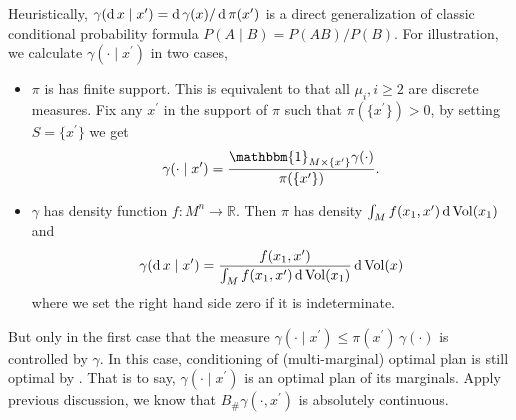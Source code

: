 Heuristically, $\gamma(\operatorname{d} x \mid x^\prime) = \operatorname{d} \gamma(x) / \operatorname{d} \pi (x^\prime)$ is a direct generalization of
classic conditional probability formula $P(A \mid B) = P(A B) / P(B)$.
For illustration, we calculate $\gamma(\cdot \mid x^\prime)$ in two cases,
\begin{itemize}
	\item $\pi$ is has finite support.
	      This is equivalent to that all $\mu_i, i \geq 2$ are discrete measures.
	      Fix any $x^\prime$ in the support of $\pi$ such that $\pi(\{x^\prime\}) >0$, by setting $S=\{x^\prime\}$ we get
	      \[
		      \gamma(\cdot \mid x^\prime) =
		      \frac{
			      \mathbbm{1}_{M \times \{x^\prime\}}
			      \gamma(\cdot)
		      }{\pi(\{x^\prime\})}.
	      \]
	\item $\gamma$ has density function $f: M^n \rightarrow \mathbb{R} $.
	      Then $\pi$ has density $\int_{M} f(x_1, x^\prime) \operatorname{d} \operatorname{Vol}(x_1)$ and
	      \[
		      \gamma(\operatorname{d} x \mid x^\prime) =
		      \frac{ f(x_1, x^\prime)} {\int_{M} f(x_1, x^\prime) \operatorname{d} \operatorname{Vol}(x_1)}\operatorname{d} \operatorname{Vol}(x)
	      \]
	      where we set the right hand side zero if it is indeterminate.
\end{itemize}
But only in the first case that the measure $\gamma(\cdot \mid x^\prime) \leq \pi(x^\prime) \, \gamma(\cdot)$
is controlled by $\gamma$.
In this case, conditioning of (multi-marginal) optimal plan is still optimal by .
That is to say, $\gamma(\cdot \mid x^\prime)$ is an optimal plan of its marginals.
Apply previous discussion, we know that $B_{\#}\gamma(\cdot, x^\prime)$
is absolutely continuous.

